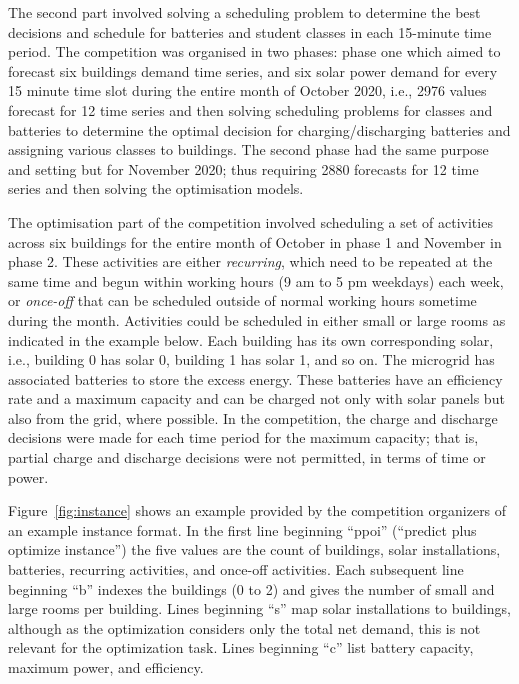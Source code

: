 \documentclass[conference]{IEEEtran}
\begin{document}
The second part involved solving a scheduling problem to determine the best decisions and schedule for batteries and student classes in each 15-minute time period. The competition was organised in two phases: phase one which aimed to forecast six buildings demand time series, and six solar power demand for every 15 minute time slot during the entire month of October 2020, i.e., 2976 values forecast for 12 time series and then solving scheduling problems for classes and batteries to determine the optimal decision for charging/discharging batteries and assigning various classes to buildings. The second phase had the same purpose and setting but for November 2020; thus requiring 2880 forecasts for 12 time series and then solving the optimisation models. 

The optimisation part of the competition involved scheduling a set of activities across six buildings for the entire month of October in phase 1 and November in phase 2. These activities are either {\it recurring}, which need to be repeated at the same time and begun within working hours (9 am to 5 pm weekdays) each week, or {\it once-off} that can be scheduled outside of normal working hours sometime during the month. Activities could be scheduled in either small or large rooms as indicated in the example below. Each building has its own corresponding solar, i.e., building 0 has solar 0, building 1 has solar 1, and so on. The microgrid has associated batteries to store the excess energy. These batteries have an efficiency rate and a maximum capacity and can be charged not only with solar panels but also from the grid, where possible. In the competition, the charge and discharge decisions were made for each time period for the maximum capacity; that is, partial charge and discharge decisions were not permitted, in terms of time or power.


Figure~\ref{fig:instance} shows an example provided by the competition organizers of an example instance format. In the first line beginning ``ppoi'' (``predict plus optimize instance'') the five values are the count of buildings, solar installations, batteries, recurring activities, and once-off activities. Each subsequent line beginning ``b'' indexes the buildings (0 to 2) and gives the number of small and large rooms per building. Lines beginning ``s'' map solar installations to buildings, although as the optimization considers only the total net demand, this is not relevant for the optimization task. Lines beginning ``c'' list battery capacity, maximum power, and efficiency. 
\end{document}

